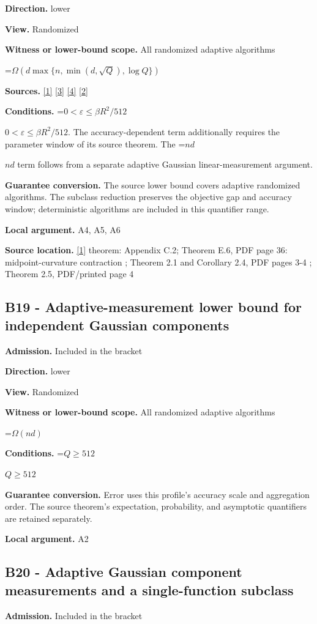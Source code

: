 \documentclass[10pt,a4paper]{article}
\newcommand{\AtlasMath}[1]{\par\begingroup\centering\setbox0=\hbox{$\displaystyle #1$}\ifdim\wd0>1.4\linewidth\typeout{ATLAS WIDE FORMULA: \the\wd0}\fi\ifdim\wd0>\linewidth\resizebox{\linewidth}{!}{\box0}\else\box0\fi\par\endgroup}
\newcommand{\AtlasInlineMath}[1]{\begingroup\setbox0=\hbox{$#1$}\ifdim\wd0>.4\linewidth\endgroup\AtlasMath{#1}\else\endgroup$#1$\fi}
\begin{document}
\textbf{Direction.} lower

\textbf{View.} Randomized

\textbf{Witness or lower-bound scope.} All randomized adaptive algorithms

\AtlasMath{\Omega\!\left(d\max\{n,\min(d,\sqrt Q),\log Q\}\right)}
\textbf{Sources.} \href{https://arxiv.org/html/2610.00345v1}{[1]} \href{https://arxiv.org/html/2607.16558v2}{[3]} \href{https://www.mathnet.ru/php/archive.phtml?jrnid=mzm&option_lang=eng&paperid=1697&wshow=paper}{[4]} \href{https://arxiv.org/abs/2109.08858}{[2]}

\textbf{Conditions.} \AtlasInlineMath{0<\varepsilon\le\beta R^2/512}. The accuracy-dependent term additionally requires the parameter window of its source theorem. The \AtlasInlineMath{nd} term follows from a separate adaptive Gaussian linear-measurement argument.

\textbf{Guarantee conversion.} The source lower bound covers adaptive randomized algorithms. The subclass reduction preserves the objective gap and accuracy window; deterministic algorithms are included in this quantifier range.

\textbf{Local argument.} A4, A5, A6

\textbf{Source location.} \href{https://arxiv.org/html/2610.00345v1}{[1]} theorem: Appendix C.2; Theorem E.6, PDF page 36: midpoint-curvature contraction ; Theorem 2.1 and Corollary 2.4, PDF pages 3-4 ; Theorem 2.5, PDF/printed page 4

\subsection{B19 - Adaptive-measurement lower bound for independent Gaussian components}
\textbf{Admission.} Included in the bracket

\textbf{Direction.} lower

\textbf{View.} Randomized

\textbf{Witness or lower-bound scope.} All randomized adaptive algorithms

\AtlasMath{\Omega(nd)}
\textbf{Conditions.} \AtlasInlineMath{Q\ge512}

\textbf{Guarantee conversion.} Error uses this profile's accuracy scale and aggregation order. The source theorem's expectation, probability, and asymptotic quantifiers are retained separately.

\textbf{Local argument.} A2

\subsection{B20 - Adaptive Gaussian component measurements and a single-function subclass}
\textbf{Admission.} Included in the bracket
\end{document}
